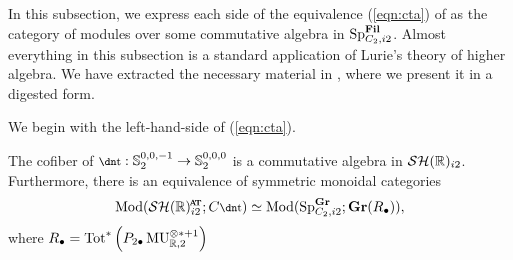 In this subsection, we express each side of the equivalence (\ref{eqn:cta}) of  as the category of modules over some commutative algebra in $\operatorname{\mathrm{Sp}}_{C_2, i2} ^{\operatorname{\mathbf{Fil}}}$.
Almost everything in this subsection is a standard application of Lurie's theory of higher algebra.
We have extracted the necessary material in , where we present it in a digested form. 

We begin with the left-hand-side of (\ref{eqn:cta}).

\begin{lem} \label{lem:gr-of-comparison}
  The cofiber of $\ta : \Ss_2^{0,0,-1} \to \Ss_2^{0,0,0}$ is a commutative algebra in $\mathcal{SH}(\mathbb{R})_{i2}$. Furthermore, there is an equivalence of symmetric monoidal categories
  \[ \mathrm{Mod}(\SHRat; C\ta) \simeq \mathrm{Mod}( \Sp_{C_2, i2}^{\Gr}; \Gr( R_\bullet ) ), \]
	where $R_{\bullet} =\mathrm{Tot}^{*}\left( P_{2\bullet} \operatorname{\mathrm{MU}}_{\mathbb{R},2}^{\otimes *+1} \right)$ 
\end{lem}

